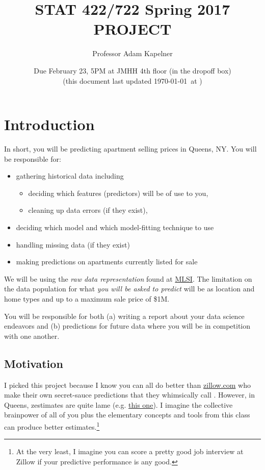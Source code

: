\documentclass[12pt]{article}
\title{STAT 422/722 Spring 2017 PROJECT}
\author{Professor Adam Kapelner}
\date{Due February 23, 5PM at JMHH 4th floor (in the dropoff box)\\ \vspace{0.5cm} \footnotesize (this document last updated \today ~at \currenttime)}
\begin{document}
\maketitle

\section{Introduction}

In short, you will be predicting apartment selling prices in Queens, NY. You will be responsible for:

\begin{itemize}
\item gathering historical data including
\begin{itemize}
\item deciding which features (predictors) will be of use to you,
\item cleaning up data errors (if they exist),
\end{itemize}
\item deciding which model and which model-fitting technique to use
\item handling missing data (if they exist)
\item making predictions on apartments currently listed for sale
\end{itemize}

We will be using the \emph{raw data representation} found at \href{http://www.mlsli.com/}{MLSI}. The limitation on the data population for what \emph{you will be asked to predict} will be  as location and home types  and  up to a maximum sale price of \$1M.

You will be responsible for both (a) writing a report about your data science endeavors and (b) predictions for future data where you will be in competition with one another.

\subsection{Motivation}

I picked this project because I know you can all do better than \url{zillow.com} who make their own secret-sauce predictions that they whimsically call . However, in Queens, zestimates are quite lame (e.g. \href{http://www.zillow.com/homes/recently_sold/Queens-New-York-NY/condo,apartment_duplex_type/2096496075_zpid/270915_rid/globalrelevanceex_sort/40.890158,-73.462143,40.452172,-74.200287_rect/10_zm/}{this one}). I imagine the collective brainpower of all of you plus the elementary concepts and tools from this class can produce better estimates.\footnote{At the very least, I imagine you can score a pretty good job interview at Zillow if your predictive performance is any good.}
\end{document}

